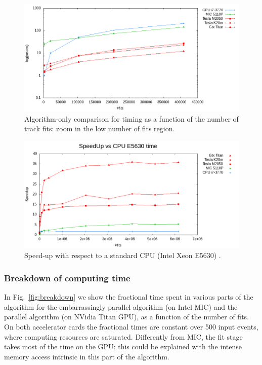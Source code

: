 \documentclass[letterpaper]{jpconf}
\begin{document}
  \begin{figure}[!tbp]
    \centering
    \includegraphics[width=0.9\linewidth]{figures/TimeCompZoom_MIC.png} 
    \caption{Algorithm-only comparison for timing as a function of the
      number of track fits: zoom in the low number of fits region.}
    \label{fig:algo_only_timing_zoom}
  \end{figure}
 
 \begin{figure}[!tbp]
   \centering
   \includegraphics[width=0.9\linewidth]{figures/Speedup_MIC.pdf}
   \caption{Speed-up with respect to a standard CPU (Intel Xeon E5630) .}
   \label{fig:algo_only_speedup}
 \end{figure}


\subsubsection{Breakdown of computing time}
In Fig.~\ref{fig:breakdown} we show the fractional time spent in
various parts of the algorithm for the embarrassingly parallel algorithm 
(on Intel MIC) and the parallel algorithm (on NVidia Titan GPU), as a 
function of the number of fits. On both accelerator cards the fractional times
are constant over 500 input events, where computing resources are saturated. 
Differently from MIC, the fit stage takes most of the time on the GPU: this 
could be explained with the intense memory access intrinsic in 
this part of the algorithm.  
\end{document}
